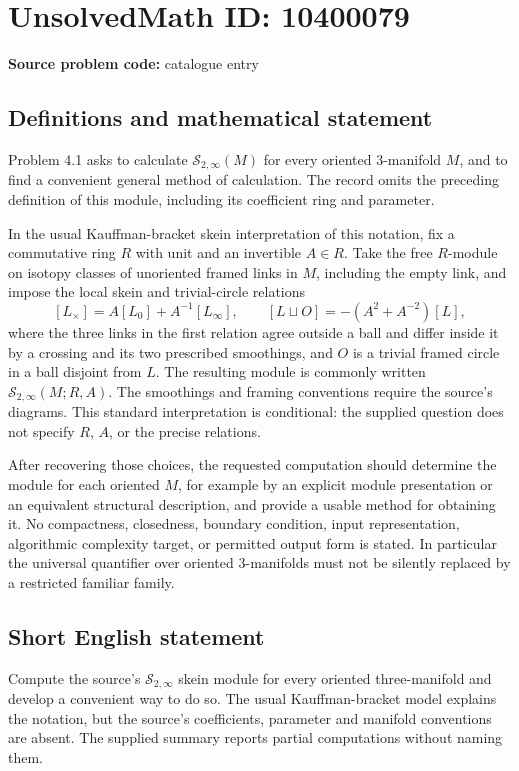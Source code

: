 \documentclass[11pt]{article}
\begin{document}
\section*{UnsolvedMath ID: 10400079}
\textbf{Source problem code:} catalogue entry
\subsection{Definitions and mathematical statement}
Problem 4.1 asks to calculate \(\mathcal S_{2,\infty}(M)\) for every oriented \(3\)-manifold \(M\), and to find a convenient general method of calculation. The record omits the preceding definition of this module, including its coefficient ring and parameter.

In the usual Kauffman-bracket skein interpretation of this notation, fix a commutative ring \(R\) with unit and an invertible \(A\in R\). Take the free \(R\)-module on isotopy classes of unoriented framed links in \(M\), including the empty link, and impose the local skein and trivial-circle relations
\[
 [L_{\times}]=A[L_0]+A^{-1}[L_{\infty}],\qquad
 [L\sqcup O]=-(A^2+A^{-2})[L],
\]
where the three links in the first relation agree outside a ball and differ inside it by a crossing and its two prescribed smoothings, and \(O\) is a trivial framed circle in a ball disjoint from \(L\). The resulting module is commonly written \(\mathcal S_{2,\infty}(M;R,A)\). The smoothings and framing conventions require the source's diagrams. This standard interpretation is conditional: the supplied question does not specify \(R\), \(A\), or the precise relations.

After recovering those choices, the requested computation should determine the module for each oriented \(M\), for example by an explicit module presentation or an equivalent structural description, and provide a usable method for obtaining it. No compactness, closedness, boundary condition, input representation, algorithmic complexity target, or permitted output form is stated. In particular the universal quantifier over oriented \(3\)-manifolds must not be silently replaced by a restricted familiar family.
\subsection{Short English statement}
Compute the source's \(\mathcal S_{2,\infty}\) skein module for every oriented three-manifold and develop a convenient way to do so. The usual Kauffman-bracket model explains the notation, but the source's coefficients, parameter and manifold conventions are absent. The supplied summary reports partial computations without naming them.
\end{document}
